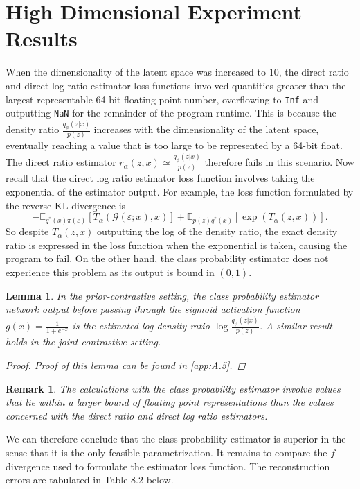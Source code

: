 \documentclass[honours,12pt]{unswthesis}
\newcommand{\E}{\mathbb{E}}
\newtheorem{lemma}[theorem]{Lemma}
\newtheorem{remark}[theorem]{Remark}
\numberwithin{equation}{section}
\theoremstyle{definition}
\begin{document}
\section{High Dimensional Experiment Results}
When the dimensionality of the latent space was increased to 10, the direct ratio and direct log ratio estimator loss functions involved quantities greater than the largest representable 64-bit floating point number, overflowing to \verb+Inf+ and outputting \verb+NaN+ for the remainder of the program runtime. This is because the density ratio $\frac{q_\phi(z|x)}{p(z)}$ increases with the dimensionality of the latent space, eventually reaching a value that is too large to be represented by a 64-bit float. The direct ratio estimator $r_\alpha(z,x)\simeq \frac{q_\phi(z|x)}{p(z)}$ therefore fails in this scenario. Now recall that the direct log ratio estimator loss function involves taking the exponential of the estimator output. For example, the loss function formulated by the reverse KL divergence is
\[-\E_{q^*(x)\pi(\varepsilon)}[T_\alpha(\mathcal{G}(\varepsilon;x),x)]+\E_{p(z)q^*(x)}[\exp(T_\alpha(z,x))].\]
So despite $T_\alpha(z,x)$ outputting the log of the density ratio, the exact density ratio is expressed in the loss function when the exponential is taken, causing the program to fail. On the other hand, the class probability estimator does not experience this problem as its output is bound in $(0,1)$.
\begin{lemma}
In the prior-contrastive setting, the class probability estimator network output before passing through the sigmoid activation function $g(x)=\frac{1}{1+e^{-x}}$ is the estimated log density ratio $\log \frac{q_\phi(z|x)}{p(z)}$. A similar result holds in the joint-contrastive setting.
\begin{proof}
Proof of this lemma can be found in \autoref{app:A.5}.
\end{proof}
\end{lemma}
\begin{remark}
The calculations with the class probability estimator involve values that lie within a larger bound of floating point representations than the values concerned with the direct ratio and direct log ratio estimators.
\end{remark}
We can therefore conclude that the class probability estimator is superior in the sense that it is the only feasible parametrization. It remains to compare the $f$-divergence used to formulate the estimator loss function. The reconstruction errors are tabulated in Table 8.2 below.
\end{document}
